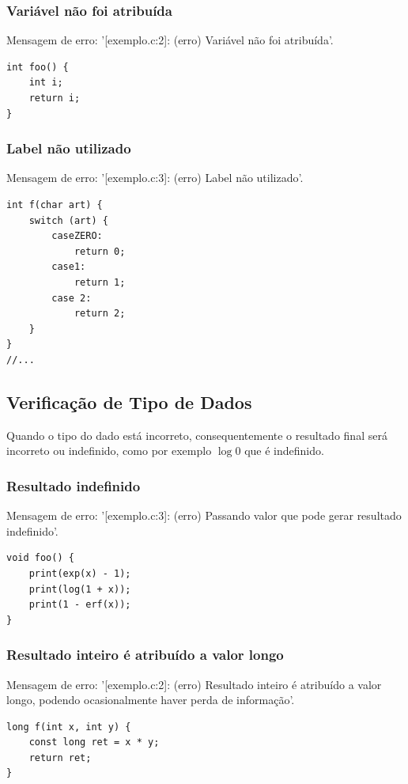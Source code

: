 \documentclass[12pt,a4paper]{report}
\begin{document}
\subsubsection{Variável não foi atribuída}
Mensagem de erro: '[exemplo.c:2]: (erro) Variável não foi atribuída'.
\begin{lstlisting}[style=CStyle]
int foo() {
    int i;
    return i;
}
\end{lstlisting}

\subsubsection{Label não utilizado}
Mensagem de erro: '[exemplo.c:3]: (erro) Label não utilizado'.
\begin{lstlisting}[style=CStyle]
int f(char art) {
    switch (art) {
        caseZERO:
            return 0;
        case1:
            return 1;
        case 2:
            return 2;
    }
}
//...
\end{lstlisting}

\subsection{Verificação de Tipo de Dados}
Quando o tipo do dado está incorreto, consequentemente o resultado final será incorreto ou indefinido, como por exemplo $\log{0}$ que é indefinido.

\subsubsection{Resultado indefinido}
Mensagem de erro: '[exemplo.c:3]: (erro) Passando valor que pode gerar resultado indefinido'.
\begin{lstlisting}[style=CStyle]
void foo() {
    print(exp(x) - 1);
    print(log(1 + x));
    print(1 - erf(x));
}
\end{lstlisting}

\subsubsection{Resultado inteiro é atribuído a valor longo}
Mensagem de erro: '[exemplo.c:2]: (erro) Resultado inteiro é atribuído a valor longo, podendo ocasionalmente haver perda de informação'.
\begin{lstlisting}[style=CStyle]
long f(int x, int y) {
    const long ret = x * y;
    return ret;
}
\end{lstlisting}
\end{document}
